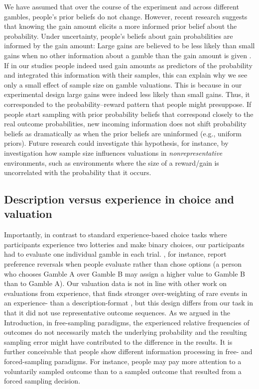 \documentclass[a4paper, man, natbib, floatsintext]{apa6}
\begin{document}
We have assumed that over the course of the experiment and across different gambles, people's prior beliefs do not change. However, recent research suggests that knowing the gain amount elicits a more informed prior belief about the probability. Under uncertainty, people's beliefs about gain probabilities are informed by the gain amount: Large gains are believed to be less likely than small gains when no other information about a gamble than the gain amount is given \citep{Pleskac2014, Hoffart2018}. If in our studies people indeed used gain amounts as predictors of the probability and integrated this information with their samples, this can explain why we see only a small effect of sample size on gamble valuations. This is because in our experimental design large gains were indeed less likely than small gains. Thus, it corresponded to the probability--reward pattern that people might presuppose. If people start sampling with prior probability beliefs that correspond closely to the real outcome probabilities, new incoming information does not shift probability beliefs as dramatically as when the prior beliefs are uninformed (e.g., uniform priors). Future research could investigate this hypothesis, for instance, by investigation how sample size influences valuations in \textit{nonrepresentative} environments, such as environments where the size of a reward/gain is uncorrelated with the probability that it occurs.

\subsection{Description versus experience in choice and valuation}
Importantly, in contrast to standard experience-based choice tasks where participants experience two lotteries and make binary choices, our participants had to evaluate one individual gamble in each trial. \cite{Lichtenstein1971}, for instance, report preference reversals when people evaluate rather than chose options (a person who chooses Gamble A over Gamble B may assign a higher value to Gamble B than to Gamble A). Our valuation data is not in line with other work on evaluations from experience, that finds stronger over-weighting of rare events in an experience- than a description-format \citep{Golan2014}, but this design differs from our task in that it did not use representative outcome sequences. As we argued in the Introduction, in free-sampling paradigms, the experienced relative frequencies of outcomes do not necessarily match the underlying probability and the resulting sampling error might have contributed to the difference in the results. It is further conceivable that people show different information processing in free- and forced-sampling paradigms. For instance, people may pay more attention to a voluntarily sampled outcome than to a sampled outcome that resulted from a forced sampling decision.
\end{document}
